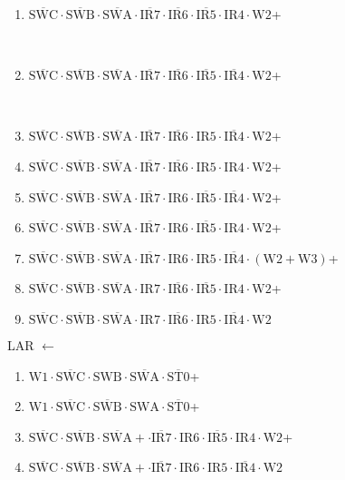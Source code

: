 \documentclass[UTF8]{ctexart}
\begin{document}
\begin{enumerate}[\indent\indent]
	\item $\overline{\text{SWC}} \cdot\overline{\text{SWB}}\cdot \overline{\text{SWA}} \cdot \overline{\text{IR7}} \cdot \overline{\text{IR6}} \cdot \overline{\text{IR5}} \cdot \text{IR4} \cdot \text{W2}$+

​	\item $\overline{\text{SWC}} \cdot\overline{\text{SWB}}\cdot \overline{\text{SWA}} \cdot \overline{\text{IR7}} \cdot \overline{\text{IR6}} \cdot \overline{\text{IR5}} \cdot \overline{\text{IR4} }\cdot \text{W2}$+

​	\item $\overline{\text{SWC}} \cdot\overline{\text{SWB}}\cdot \overline{\text{SWA}} \cdot \overline{\text{IR7}} \cdot \overline{\text{IR6}} \cdot \text{IR5} \cdot \overline{\text{IR4}} \cdot \text{W2}$+
​	\item $\overline{\text{SWC}} \cdot\overline{\text{SWB}}\cdot \overline{\text{SWA}} \cdot \overline{\text{IR7}} \cdot \overline{\text{IR6}} \cdot \text{IR5} \cdot \text{IR4} \cdot \text{W2}$+
​	\item $\overline{\text{SWC}} \cdot\overline{\text{SWB}}\cdot \overline{\text{SWA}} \cdot \overline{\text{IR7}} \cdot \text{IR6} \cdot \overline{\text{IR5}} \cdot \overline{\text{IR4}} \cdot \text{W2}$+
​	\item $\overline{\text{SWC}} \cdot\overline{\text{SWB}}\cdot \overline{\text{SWA}} \cdot \overline{\text{IR7}} \cdot \text{IR6} \cdot \overline{\text{IR5}} \cdot \text{IR4} \cdot \text{W2}$+
​	\item $\overline{\text{SWC}} \cdot\overline{\text{SWB}}\cdot \overline{\text{SWA}} \cdot \overline{\text{IR7}} \cdot \text{IR6} \cdot \text{IR5} \cdot \overline{\text{IR4}} \cdot (\text{W2} + \text{W3})$+
​	\item $\overline{\text{SWC}} \cdot\overline{\text{SWB}}\cdot \overline{\text{SWA}} \cdot \text{IR7} \cdot \overline{\text{IR6}} \cdot \overline{\text{IR5}} \cdot \text{IR4} \cdot \text{W2}$+
​	\item $\overline{\text{SWC}} \cdot\overline{\text{SWB}}\cdot \overline{\text{SWA}} \cdot \text{IR7} \cdot \overline{\text{IR6}} \cdot \text{IR5} \cdot \overline{\text{IR4}} \cdot \text{W2}$
\end{enumerate}
LAR $\leftarrow$
\begin{enumerate}[\indent\indent]
	\item $\text{W1} \cdot \overline{\text{SWC}} \cdot \text{SWB} \cdot \overline{\text{SWA}} \cdot \overline{\text{ST0}}$+
	\item $\text{W1} \cdot \overline{\text{SWC}} \cdot \overline{\text{SWB}} \cdot \text{SWA} \cdot \overline{\text{ST0}}$+
	\item $\overline{\text{SWC}} \cdot\overline{\text{SWB}}\cdot \overline{\text{SWA}}+ \cdot \overline{\text{IR7}} \cdot \text{IR6} \cdot \overline{\text{IR5}} \cdot \text{IR4} \cdot \text{W2}$+
	\item $\overline{\text{SWC}} \cdot\overline{\text{SWB}}\cdot \overline{\text{SWA}}+ \cdot \overline{\text{IR7}} \cdot \text{IR6} \cdot \text{IR5} \cdot \overline{\text{IR4}} \cdot \text{W2}$
\end{enumerate}
\end{document}
